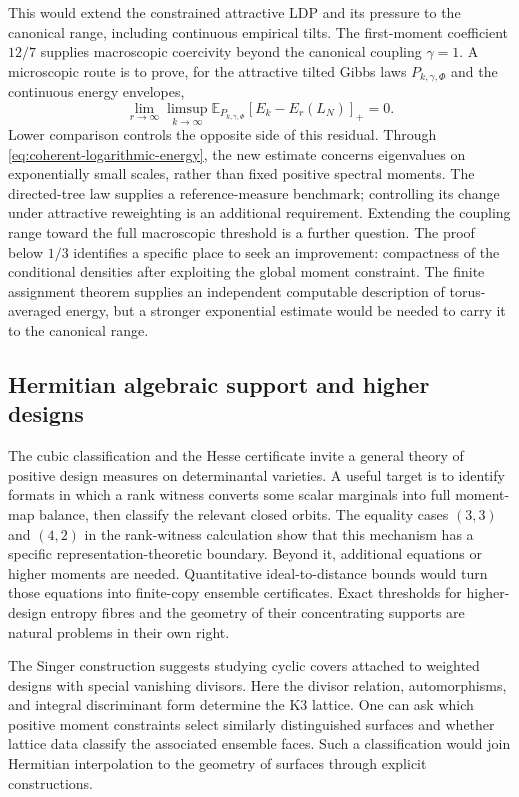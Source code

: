 This would extend the constrained attractive LDP and its pressure to the
canonical range, including continuous empirical tilts. The first-moment coefficient
$12/7$ supplies macroscopic coercivity beyond the canonical coupling
$\gamma=1$. A microscopic route is to prove, for the attractive tilted
Gibbs laws $P_{k,\gamma,\Phi}$ and the continuous energy envelopes,
\[
 \lim_{r\to\infty}\limsup_{k\to\infty}
 \mathbb E_{P_{k,\gamma,\Phi}}
       [E_k-E_r(L_N)]_+=0.
\]
Lower comparison controls the opposite side of this residual. Through
\eqref{eq:coherent-logarithmic-energy}, the new estimate concerns
eigenvalues on exponentially small scales, rather than fixed positive
spectral moments. The directed-tree law supplies a reference-measure
benchmark; controlling its change under attractive reweighting is an
additional requirement. Extending the coupling
range toward the full macroscopic threshold is a further question.
The proof below $1/3$ identifies a specific place to seek an improvement:
compactness of the conditional densities after exploiting the global
moment constraint. The finite assignment theorem supplies an independent
computable description of torus-averaged energy, but a stronger
exponential estimate would be needed to carry it to the canonical range.

\subsection{Hermitian algebraic support and higher designs}

The cubic classification and the Hesse certificate invite a general theory
of positive design measures on determinantal varieties. A useful target
is to identify formats in which a rank witness converts some scalar
marginals into full moment-map balance, then classify the relevant closed
orbits. The equality cases $(3,3)$ and $(4,2)$ in the rank-witness
calculation show that this mechanism has a specific representation-theoretic
boundary. Beyond it, additional equations or higher moments are needed.
Quantitative ideal-to-distance bounds would turn those equations into
finite-copy ensemble certificates. Exact thresholds for higher-design
entropy fibres and the geometry of their concentrating supports are
natural problems in their own right.

The Singer construction suggests studying cyclic covers attached to
weighted designs with special vanishing divisors. Here the divisor
relation, automorphisms, and integral discriminant form determine the K3
lattice. One can ask which positive moment constraints select similarly
distinguished surfaces and whether lattice data classify the associated
ensemble faces. Such a classification would join Hermitian interpolation
to the geometry of surfaces through explicit constructions.

